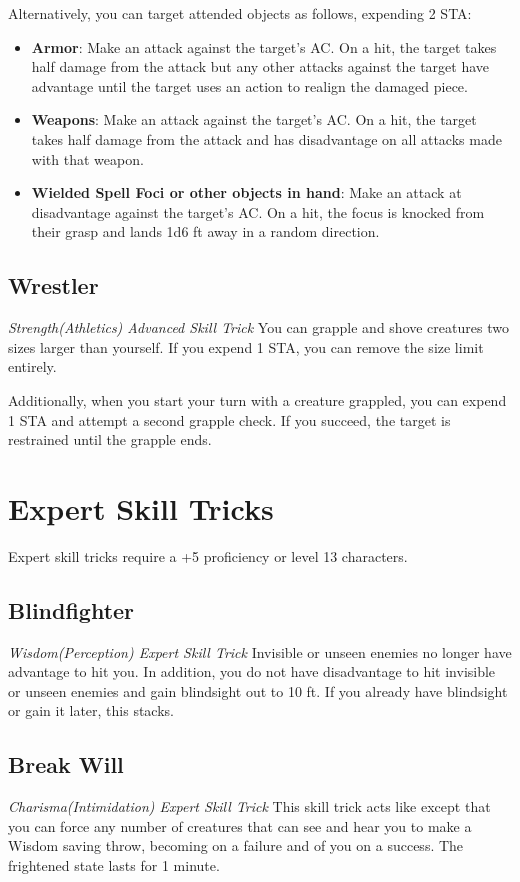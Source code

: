 Alternatively, you can target attended objects as follows, expending 2 STA:
\begin{itemize}
	\item \textbf{Armor}: Make an attack against the target's AC. On a hit, the target takes half damage from the attack but any other attacks against the target have advantage until the target uses an action to realign the damaged piece.
	\item \textbf{Weapons}: Make an attack against the target's AC. On a hit, the target takes half damage from the attack and has disadvantage on all attacks made with that weapon.
	\item \textbf{Wielded Spell Foci or other objects in hand}: Make an attack at disadvantage against the target's AC. On a hit, the focus is knocked from their grasp and lands 1d6  ft away in a random direction.
\end{itemize}

\subsection{Wrestler}
\textit{Strength(Athletics) Advanced Skill Trick}
You can grapple and shove creatures two sizes larger than yourself. If you expend 1 STA, you can remove the size limit entirely.

Additionally, when you start your turn with a creature grappled, you can expend 1 STA and attempt a second grapple check. If you succeed, the target is restrained until the grapple ends.

\section{Expert Skill Tricks}
\label{sec:skill-tricks-expert}

Expert skill tricks require a +5 proficiency or level 13 characters.

\subsection{Blindfighter}
\textit{Wisdom(Perception) Expert Skill Trick}
Invisible or unseen enemies no longer have advantage to hit you. In addition, you do not have disadvantage to hit invisible or unseen enemies and gain blindsight out to 10 ft. If you already have blindsight or gain it later, this stacks.

\subsection{Break Will}
\textit{Charisma(Intimidation) Expert Skill Trick}
This skill trick acts like  except that you can force any number of creatures that can see and hear you to make a Wisdom saving throw, becoming  on a failure and  of you on a success. The frightened state lasts for 1 minute.


